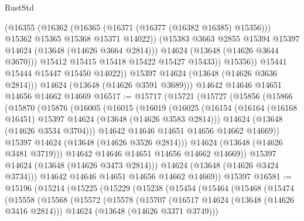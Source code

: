 \begin{lexlean}{RustStd}
\begin{coremodule}
                      (@16355
                        (@16362
                          (@16365 (@16371 (@16377 (@16382 @16385) @15356)))
                          @15362
                          @15365
                          @15368
                          @15371
                          @14022))
                      (@15383 @3663 @2855 @15394 @15397 @14624 (@13648 (@14626 @3664 @2814)))
                      @14624
                      (@13648 (@14626 @3644 @3670)))
                    @15412
                    @15415
                    @15418
                    @15422
                    @15427
                    @15433))
                @15356))
            @15441
            @15444
            @15447
            @15450
            @14022))
        @15397
        @14624
        (@13648 (@14626 @3636 @2814)))
      @14624
      (@13648 (@14626 @3591 @3689)))
    @14642
    @14646
    @14651
    @14656
    @14662
    @14669
@16517 := @15717
    (@15721
      (@15727
        (@15856
          (@15866
            (@15870
              (@15876
                (@16005
                  (@16015
                    (@16019
                      (@16025
                        (@16154
                          (@16164 (@16168 @16451) @15397 @14624 (@13648 (@14626 @3583 @2814)))
                          @14624
                          (@13648 (@14626 @3534 @3704)))
                        @14642
                        @14646
                        @14651
                        @14656
                        @14662
                        @14669))
                    @15397
                    @14624
                    (@13648 (@14626 @3526 @2814)))
                  @14624
                  (@13648 (@14626 @3481 @3719)))
                @14642
                @14646
                @14651
                @14656
                @14662
                @14669))
            @15397
            @14624
            (@13648 (@14626 @3473 @2814)))
          @14624
          (@13648 (@14626 @3424 @3734)))
        @14642
        @14646
        @14651
        @14656
        @14662
        @14669))
    @15397
@16581 := @15196
    (@15214
      (@15225
        (@15229
          (@15238
            (@15454
              (@15464
                (@15468
                  (@15474
                    (@15558
                      (@15568
                        (@15572
                          (@15578
                            (@15707
                              (@16517 @14624 (@13648 (@14626 @3416 @2814)))
                              @14624
                              (@13648 (@14626 @3371 @3749)))

\end{coremodule}
\end{lexlean}
